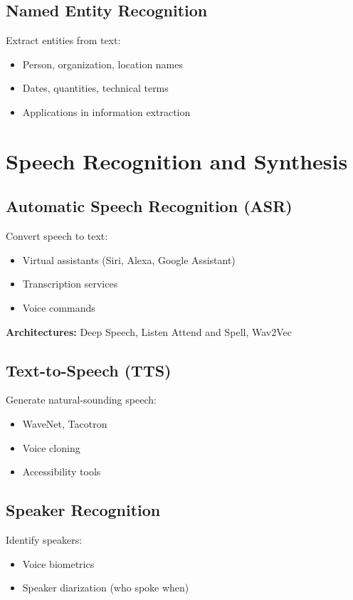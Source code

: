 \subsection{Named Entity Recognition}

Extract entities from text:
\begin{itemize}
    \item Person, organization, location names
    \item Dates, quantities, technical terms
    \item Applications in information extraction
\end{itemize}

\section{Speech Recognition and Synthesis}
\label{sec:speech-applications}

\subsection{Automatic Speech Recognition (ASR)}

Convert speech to text:
\begin{itemize}
    \item Virtual assistants (Siri, Alexa, Google Assistant)
    \item Transcription services
    \item Voice commands
\end{itemize}

\textbf{Architectures:} Deep Speech, Listen Attend and Spell, Wav2Vec

\subsection{Text-to-Speech (TTS)}

Generate natural-sounding speech:
\begin{itemize}
    \item WaveNet, Tacotron
    \item Voice cloning
    \item Accessibility tools
\end{itemize}

\subsection{Speaker Recognition}

Identify speakers:
\begin{itemize}
    \item Voice biometrics
    \item Speaker diarization (who spoke when)
\end{itemize}

